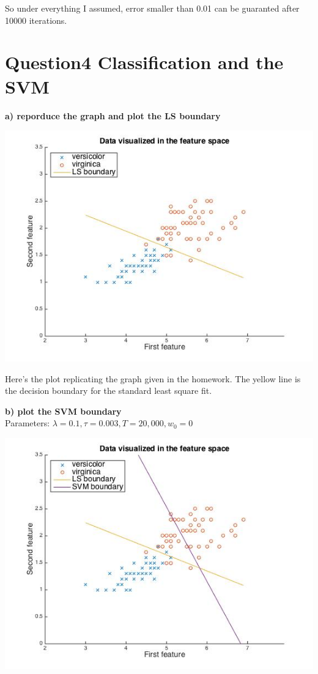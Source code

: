 \documentclass[paper=a4, fontsize=11pt]{scrartcl} %
\numberwithin{equation}{section} %
\numberwithin{figure}{section} %
\numberwithin{table}{section} %
\begin{document}
So under everything I assumed, error smaller than 0.01 can be guaranted after 10000 iterations. 

\newpage
\section*{Question4 Classification and the SVM}

\textbf{a) reporduce the graph and plot the LS boundary}
\begin{center}
\includegraphics[scale=.6]{hw7_4a_532.jpg}
\end{center}

Here's the plot replicating the graph given in the homework. The yellow line is the decision boundary for the standard least square fit.

\newpage
\textbf{b) plot the SVM boundary}\\
Parameters:
$\lambda = 0.1, \tau = 0.003, T = 20,000, w_0 = 0$
\begin{center}
\includegraphics[scale=.6]{hw7_4b_532.jpg}
\end{center}
\end{document}
